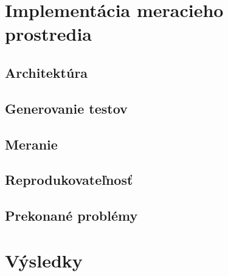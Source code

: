 \section{Implementácia meracieho prostredia}\label{sec:implementacia}

\subsection{Architektúra}\label{sec:architektura}

\subsection{Generovanie testov}\label{sec:impl-generovanie}

\subsection{Meranie}\label{sec:impl-meranie}

\subsection{Reprodukovateľnosť}\label{sec:reprodukovatelnost}

\subsection{Prekonané problémy}\label{sec:problemy}

\section{Výsledky}\label{sec:vysledky}


